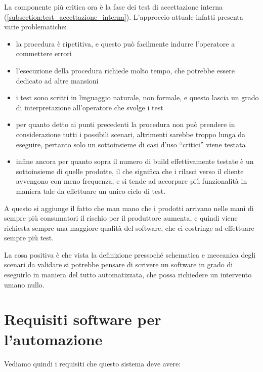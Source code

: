 \documentclass[12pt,a4paper,twoside,titlepage]{book}
\begin{document}
La componente più critica ora è la fase dei test di accettazione interna (\autoref{subsection:test_accettazione_interna}). 
L'approccio attuale infatti presenta varie problematiche:
\begin{itemize}
    \item la procedura è ripetitiva, e questo può facilmente indurre
        l'operatore a commettere errori
    \item l'esecuzione della procedura richiede molto tempo, che potrebbe essere dedicato
        ad altre mansioni
    \item i test sono scritti in linguaggio naturale, non formale, e questo lascia un grado di 
        interpretazione all'operatore che svolge i test
    \item per quanto detto ai punti precedenti la procedura non può prendere in considerazione 
        tutti i possibili scenari, altrimenti sarebbe troppo lunga da eseguire, pertanto solo un 
        sottoinsieme di casi d'uso ``critici'' viene testata
    \item infine ancora per quanto sopra il numero di build effettivamente testate
        è un sottoinsieme di quelle prodotte, il che significa che
        i rilasci verso il cliente avvengono con meno frequenza, e si tende ad accorpare
        più funzionalità in maniera tale da effettuare un unico ciclo di test.
\end{itemize}

A questo si aggiunge il fatto che man mano che i prodotti arrivano nelle mani di sempre più consumatori 
il rischio per il produttore aumenta, e quindi viene richiesta sempre una maggiore qualità del software, 
che ci costringe ad effettuare sempre più test. 

La cosa positiva è che vista la definizione pressoché schematica e meccanica degli scenari da validare 
si potrebbe pensare di scrivere un software in grado di eseguirlo in maniera del tutto automatizzata, 
che possa richiedere un intervento umano nullo.

\section{Requisiti software per l'automazione}

Vediamo quindi i requisiti che questo sistema deve avere:
\end{document}

